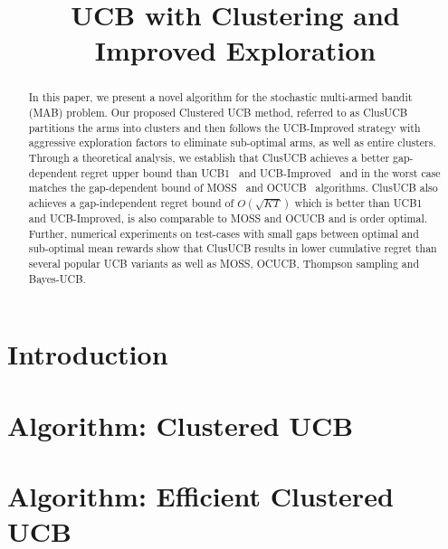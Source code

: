 \documentclass{article}
\title{UCB with Clustering and Improved Exploration}
\begin{document}

\maketitle

\begin{abstract}
In this paper, we present a novel algorithm for the stochastic multi-armed bandit (MAB) problem. Our proposed Clustered UCB method, referred to as ClusUCB partitions the arms into clusters and then follows the UCB-Improved strategy with aggressive exploration factors to eliminate sub-optimal arms, as well as entire clusters. Through a theoretical analysis, we establish that ClusUCB achieves a better gap-dependent regret upper bound than UCB1~\citep{auer2002finite} and UCB-Improved~\citep{auer2010ucb} and in the worst case matches the gap-dependent bound of MOSS~\citep{audibert2009minimax} and OCUCB~\citep{lattimore2015optimally}  algorithms. ClusUCB also achieves a gap-independent regret bound of $O\left(\sqrt{KT}\right)$ which is better than UCB1 and UCB-Improved, is also comparable to MOSS and OCUCB and is order optimal. Further, numerical experiments on test-cases with small gaps between optimal and sub-optimal mean rewards show that ClusUCB results in lower cumulative regret than several popular UCB variants as well as MOSS, OCUCB, Thompson sampling and Bayes-UCB. 

\end{abstract}

\section{Introduction}
\label{sec:intro}


\section{Algorithm: Clustered UCB}
\label{sec:clusucb}


\section{Algorithm: Efficient Clustered UCB}
\label{sec:eclusucb}

\end{document}
